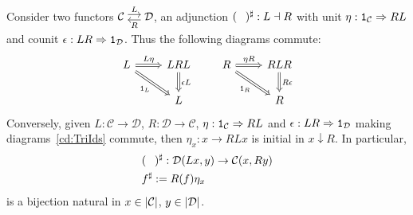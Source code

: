 \begin{proposition}
  Consider two functors \(\begin{tikzcd}[column sep=small, cramped] \mathcal{C}
    \ar["{L}", r, shift left] & \mathcal{D} \ar["{R}", l, shift
    left] \end{tikzcd}\), an adjunction \((\hole)^\sharp : L \dashv R\) with unit
  \(\eta : \mathtt 1_{\mathcal{C}} \Rightarrow RL\) and counit
  \(\epsilon : LR \Rightarrow \mathtt 1_{\mathcal{D}}\). Thus the following diagrams commute:
  \begin{equation}
    \begin{tikzcd}
      L \ar["{L\eta}", r, Rightarrow] \ar["{\id_L}", dr, Rightarrow, swap]
      & LRL
      \ar["{\epsilon L}", d, Rightarrow] \\
      & L
    \end{tikzcd}
    \qquad
    \begin{tikzcd}
      R \ar["{\eta R}", r, Rightarrow] \ar["{\id_R}", dr, Rightarrow, swap]
      & RLR
      \ar["{R\epsilon}", d, Rightarrow] \\
      & R
    \end{tikzcd}
    \label{cd:TriIds}
  \end{equation}
  Conversely, given \(L : \mathcal{C} \to \mathcal{D}\),
  \(R : \mathcal{D} \to \mathcal{C}\), \(\eta : \mathtt 1_{\mathcal{C}} \Rightarrow RL\) and
  \(\epsilon : LR \Rightarrow \mathtt 1_{\mathcal{D}}\) making diagrams~\eqref{cd:TriIds} commute,
  then \(\eta_x : x \to RLx\) is initial in \(x \downarrow R\). In particular,
  \begin{align*}
    & (\hole)^\sharp : \mathcal{D}(Lx, y) \to \mathcal{C}(x, Ry) \\
    & f^\sharp := R(f) \eta_x
  \end{align*}
  is a bijection natural in \(x \in \left\lvert\mathcal{C}\right\rvert\),
  \(y \in \left\lvert\mathcal{D}\right\rvert\).
\end{proposition}

